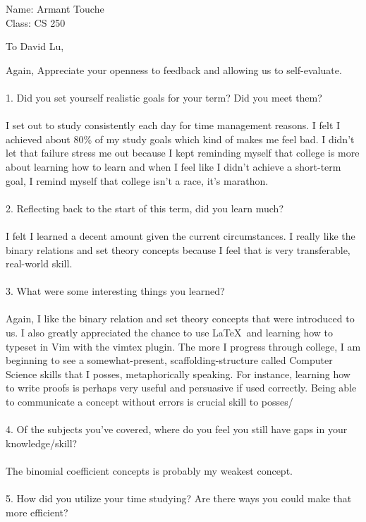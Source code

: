 \documentclass{letter}
\begin{document}
\begin{letter}{Name: Armant Touche \\ Class: CS 250 
\\ }
\opening{To David Lu,}

Again, Appreciate your openness to feedback and allowing us to self-evaluate.\\\\
1. Did you set yourself realistic goals for your term? Did you meet them?\\\\
I set out to study consistently each day for time management reasons. I felt I achieved about 80\% of my study goals which kind of makes me feel bad. I didn't let that failure stress me out because I kept reminding myself that college is more about learning how to learn and when I feel like I didn't achieve a short-term goal, I remind myself that college isn't a race, it's marathon.\\\\
2. Reflecting back to the start of this term, did you learn much?\\\\
I felt I learned a decent amount given the current circumstances. I really like the binary relations and set theory concepts because I feel that is very transferable, real-world skill.\\\\
3. What were some interesting things you learned?\\\\
Again, I like the binary relation and set theory concepts that were introduced to us. I also greatly appreciated the chance to use \LaTeX\ and learning how to typeset in Vim with the vimtex plugin. The more I progress through college, I am beginning to see a somewhat-present, scaffolding-structure called Computer Science skills that I posses, metaphorically speaking. For instance, learning how to write proofs is perhaps very useful and persuasive if used correctly. Being able to communicate a concept without errors is crucial skill to posses/\\\\
4. Of the subjects you’ve covered, where do you feel you still have gaps in your knowledge/skill?\\\\
The  binomial coefficient concepts is probably my weakest concept.\\\\
5. How did you utilize your time studying? Are there ways you could make that more efficient?\\\\

\end{letter}
\end{document}
